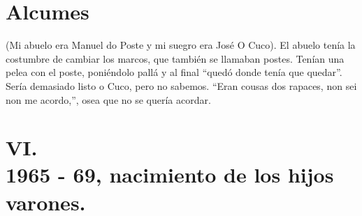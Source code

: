 \documentclass[12pt,a5paper]{book}
\begin{document}
\section*{Alcumes}

(Mi abuelo era Manuel do Poste y mi suegro era José O Cuco).
El abuelo tenía la costumbre de cambiar los marcos, que también se llamaban postes. Tenían una pelea con el poste, poniéndolo pallá y al final “quedó donde tenía que quedar”.
Sería demasiado listo o Cuco, pero no sabemos. “Eran cousas dos rapaces, non sei non me acordo,”, osea que no se quería acordar.


\section*{VI.\\1965 - 69, nacimiento de los hijos varones.}
\end{document}
